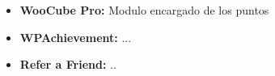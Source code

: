 \begin{itemize}
    \item {\bf WooCube Pro:}
        Modulo encargado de los puntos

    \item {\bf WPAchievement:}
        ...

    \item {\bf Refer a Friend:}
        ..
\end{itemize}
